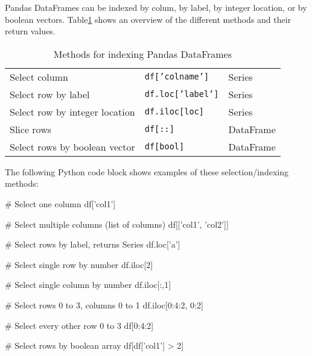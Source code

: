


Pandas DataFrames can be indexed by colum, by label, by integer location, or by boolean vectors. Table\ref{tab:pandasindexing} shows an overview of the different methods and their return values.

\begin{table}[h]
\centering
\renewcommand{\arraystretch}{1.25}
\begin{tabular}{l|l|l} \hline
Select column & \texttt{df['colname']} & Series \\
Select row by label & \texttt{df.loc['label']}  & Series \\
Select row by integer location & \texttt{df.iloc[loc]} & Series \\
Slice rows & \texttt{df[::]} & DataFrame \\
Select rows by boolean vector & \texttt{df[bool]} & DataFrame \\ \hline
\end{tabular}
\caption{Methods for indexing Pandas DataFrames}
\label{tab:pandasindexing}
\end{table}

The following Python code block shows examples of these selection/indexing methods:
\begin{pythoncode}
# Select one column
df['col1']

# Select multiple columns (list of columns)
df[['col1', 'col2']]

# Select rows by label, returns Series
df.loc['a']

# Select single row by number
df.iloc[2]

# Select single column by number
df.iloc[:,1]

# Select rows 0 to 3, columns 0 to 1
df.iloc[0:4:2, 0:2] 

# Select every other row 0 to 3
df[0:4:2]

# Select rows by boolean array
df[df['col1'] > 2]
\end{pythoncode}


